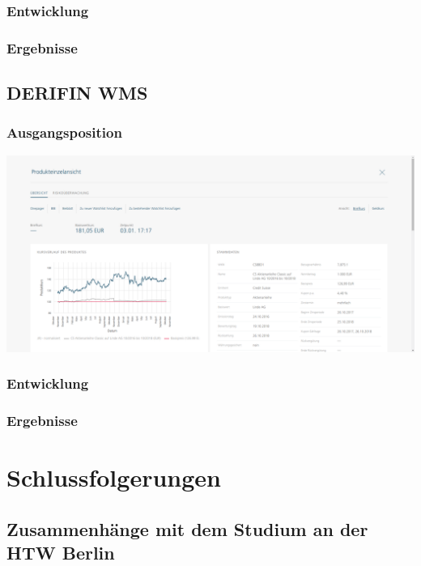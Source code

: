 \documentclass[chapterprefix=false, 12pt, a4paper, oneside, parskip=half, listof=totoc, bibliography=totoc, numbers=noendperiod]{scrbook}
\begin{document}
    \subsection{Entwicklung}

    \subsection{Ergebnisse}

    \section{DERIFIN WMS}

    \subsection{Ausgangsposition}

    \includegraphics[width=1.00\textwidth]{img/derifin.png}

    \subsection{Entwicklung}

    \subsection{Ergebnisse}

    \chapter{Schlussfolgerungen}

    \section{Zusammenhänge mit dem Studium an der HTW Berlin}
\end{document}
